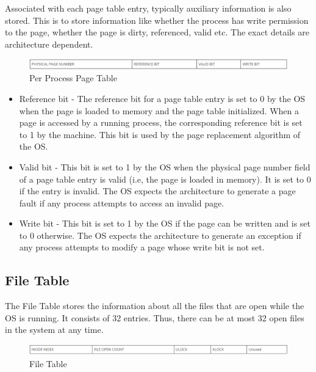 Associated with each page table entry, typically auxiliary information is also stored. This is to store information like whether the process has write permission to the page, whether the page is dirty, referenced, valid etc. The exact details are architecture dependent.

\begin{figure}[ht]
\centering
\includegraphics  [scale=0.55]{figures/pgt.png}
\caption{\footnotesize Per Process Page Table}
\end{figure}

\begin {itemize}
\item Reference bit - The reference bit for a page table entry is set to 0 by the OS when the page is loaded to memory and the page table initialized. When a page is accessed by a running process, the corresponding reference bit is set to 1 by the machine. This bit is used by the page replacement algorithm of the OS.
\item Valid bit - This bit is set to 1 by the OS when the physical page number field of a page table entry is valid (i.e, the page is loaded in memory). It is set to 0 if the entry is invalid. The OS expects the architecture to generate a page fault if any process attempts to access an invalid page.
\item Write bit - This bit is set to 1 by the OS if the page can be written and is set to 0 otherwise. The OS expects the architecture to generate an exception if any process attempts to modify a page whose write bit is not set.
\end {itemize}

\subsection{File Table}
The File Table stores the information about all the files that are open while the OS is running. It consists of 32 entries. Thus, there can be at most 32 open files in the system at any time.
\begin{figure}[ht]
\centering
\includegraphics  [scale=0.55]{figures/ft.png}
\caption{\footnotesize File Table}
\end{figure}

